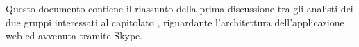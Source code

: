 Questo documento contiene il riassunto della prima discussione tra gli analisti dei due gruppi interessati al capitolato \progetto, riguardante l'architettura dell'applicazione web ed avvenuta tramite Skype.

